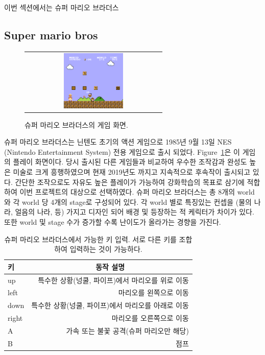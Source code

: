 이번 섹션에서는 슈퍼 마리오 브라더스 

\subsection{Super mario bros}

\begin{figure}[]
\begin{center}
\begin{tabular}{c}
     \includegraphics[width=0.45\textwidth]{FIG/SuperMarioBros.png} \\
\end{tabular}
\caption{
	슈퍼 마리오 브라더스의 게임 화면.
}
\label{fig:mario_title}
\end{center}
\end{figure}

슈퍼 마리오 브라더스는 닌텐도 초기의 액션 게임으로 1985년 9월 13일 NES (Nintendo Entertainment System) 전용 게임으로 출시 되었다.
Figure~\ref{fig:mario_title}은 이 게임의 플레이 화면이다.
당시 출시된 다른 게임들과 비교하여 우수한 조작감과 완성도 높은 미술로 크게 흥행하였으며 현재 2019년도 까지고 지속적으로 후속작이 출시되고 있다.
간단한 조작으로도 자유도 높은 플레이가 가능하여 강화학습의 목표로 삼기에 적합하여 이번 프로젝트의 대상으로 선택하였다.
슈퍼 마리오 브라더스는 총 8개의 world 와 각 world 당 4개의 stage로 구성되어 있다.
각 world 별로 특징있는 컨셉을 (물의 나라, 얼음의 나라, 등) 가지고 디자인 되어 배경 및 등장하는 적 케릭터가 차이가 있다.
또한 world 및 stage 수가 증가할 수록 난이도가 올라가는 경향을 가진다.

\begin{table}[]
	\caption {
		슈퍼 마리오 브라더스에서 가능한 키 입력. 서로 다른 키를 조합하여 입력하는 것이 가능하다.
	}
	\label{tab:mario:key}
\begin{tabular}{lr}
\toprule
키     & \multicolumn{1}{c}{동작 설명} \\
\midrule
up    & 특수한 상황(넝쿨, 파이프)에서 마리오를 위로 이동 \\
left  & 마리오를 왼쪽으로 이동 \\
down  & 특수한 상황(넝쿨, 파이프)에서 마리오를 아래로 이동 \\
right & 마리오를 오른쪽으로 이동 \\
A     & 가속 또는 불꽃 공격(슈퍼 마리오만 해당)\\
B     & 점프 \\
\bottomrule
\end{tabular}
\end{table}

